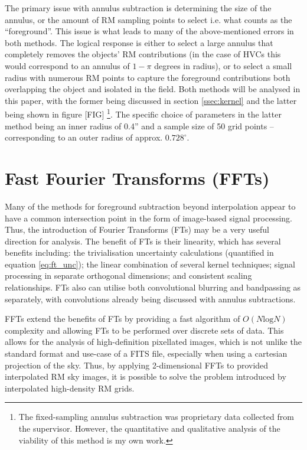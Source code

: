 The primary issue with annulus subtraction is determining the size of the annulus, or the amount of RM sampling points to select i.e. what counts as the “foreground”. This issue is what leads to many of the above-mentioned errors in both methods. The logical response is either to select a large annulus that completely removes the objects' RM contributions (in the case of HVCs this would correspond to an annulus of $1-\pi$ degrees in radius), or to select a small radius with numerous RM points to capture the foreground contributions both overlapping the object and isolated in the field. Both methods will be analysed in this paper, with the former being discussed in section \ref{ssec:kernel} and the latter being shown in figure [FIG] \footnote{The fixed-sampling annulus subtraction was proprietary data collected from the supervisor. However, the quantitative and qualitative analysis of the viability of this method is my own work.}. The specific choice of parameters in the latter method being an inner radius of 0.4” and a sample size of 50 grid points – corresponding to an outer radius of approx. $0.728^{\circ}$.

\section{Fast Fourier Transforms (FFTs)}
\label{sec:ffts}

Many of the methods for foreground subtraction beyond interpolation appear to have a common intersection point in the form of image-based signal processing. Thus, the introduction of Fourier Transforms (FTs) may be a very useful direction for analysis. The benefit of FTs is their linearity, which has several benefits including: the trivialisation uncertainty calculations (quantified in equation \ref{eq:ft_unc}); the linear combination of several kernel techniques; signal processing in separate orthogonal dimensions; and consistent scaling relationships. FTs also can utilise both convolutional blurring and bandpassing as separately, with convolutions already being discussed with annulus subtractions.


FFTs extend the benefits of FTs by providing a fast algorithm of $O(N\mathrm{log}N)$ complexity and allowing FTs to be performed over discrete sets of data. This allows for the analysis of high-definition pixellated images, which is not unlike the standard format and use-case of a FITS file, especially when using a cartesian projection of the sky. Thus, by applying 2-dimensional FFTs to provided interpolated RM sky images, it is possible to solve the problem introduced by interpolated high-density RM grids.

